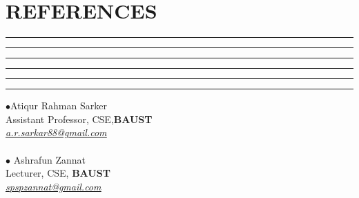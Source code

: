\documentclass{article}
\begin{document}
 \section*{\color{blue}REFERENCES }
  \hrule \hrule \hrule \hrule \hrule \hrule
 \vspace{0.4cm}

 $\bullet$\hspace{0.2cm}Atiqur Rahman Sarker\\ \hspace*{0.4cm}Assistant Professor, CSE,\textbf{BAUST}\\
 \textit{\hspace*{0.4cm}\href{mailto:a.r.sarkar88@gmail.com}{\underline{\color{blue}a.r.sarkar88@gmail.com}}}\\
 \\
  $\bullet$ \hspace{0.2cm}Ashrafun Zannat\\ \hspace*{0.4cm}Lecturer, CSE, \textbf{BAUST}\\
 \textit{\hspace*{0.4cm}\href{mailto:spspzannat@gmail.com}{\underline{\color{blue}spspzannat@gmail.com}}}
\end{document}
